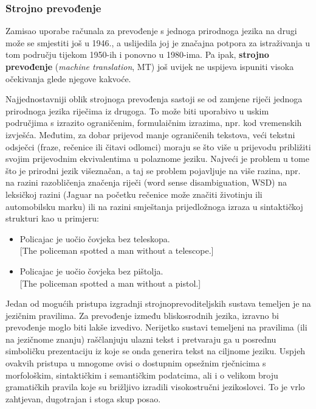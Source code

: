 \begin{multicols}{2}
\subsubsection{Strojno prevođenje}

Zamisao uporabe računala za prevođenje s jednoga prirodnoga jezika na drugi može se smjestiti još u 1946., a uslijedila joj je značajna potpora za istraživanja u tom području tijekom 1950-ih i ponovno u 1980-ima. Pa ipak, \textbf{strojno prevođenje} (\emph{machine translation}, MT) još uvijek ne uspijeva ispuniti visoka očekivanja glede njegove kakvoće. 


Najjednostavniji oblik strojnoga prevođenja sastoji se od zamjene riječi jednoga prirodnoga jezika riječima iz drugoga. To može biti uporabivo u uskim područjima s izrazito ograničenim, formulaičnim izrazima, npr. kod vremenskih izvješća. Međutim, za dobar prijevod manje ograničenih tekstova, veći tekstni odsječci (fraze, rečenice ili čitavi odlomci) moraju se što više u prijevodu približiti svojim prijevodnim ekvivalentima u polaznome jeziku. Najveći je problem u tome što je prirodni jezik višeznačan, a taj se problem pojavljuje na više razina, npr. na razini razobličenja značenja riječi (word sense disambiguation, WSD) na leksičkoj razini (Jaguar na početku rečenice može značiti životinju ili automobilsku marku) ili na razini smještanja prijedložnoga izraza u sintaktičkoj strukturi kao u primjeru:

\begin{itemize}
\item Policajac je uočio čovjeka bez teleskopa.\\
  {[}The policeman spotted a man without a telescope.{]} 
\item Policajac je uočio čovjeka bez pištolja.\\
  {[}The policeman spotted a man without a pistol.{]}
\end{itemize}

Jedan od mogućih pristupa izgradnji strojnoprevoditeljskih sustava temeljen je na jezičnim pravilima. Za prevođenje između bliskosrodnih jezika, izravno bi prevođenje moglo biti lakše izvedivo. Nerijetko sustavi temeljeni na pravilima (ili na jezičnome znanju) raščlanjuju ulazni tekst i pretvaraju ga u posrednu simboličku prezentaciju iz koje se onda generira tekst na ciljnome jeziku. Uspjeh ovakvih pristupa u mnogome ovisi o dostupnim opsežnim rječnicima s morfološkim, sintaktičkim i semantičkim podatcima, ali i o velikom broju gramatičkih pravila koje su brižljivo izradili visokostručni jezikoslovci. To je vrlo zahtjevan, dugotrajan i stoga skup posao.


\end{multicols}
